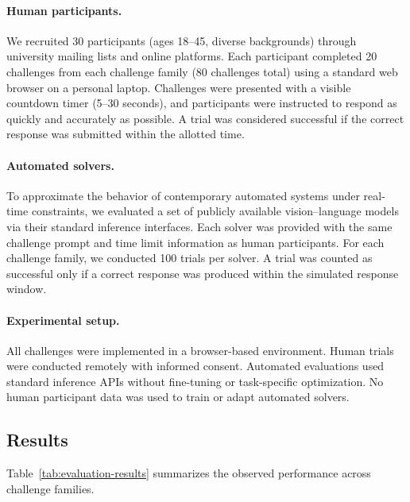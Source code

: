 \documentclass[11pt]{article}
\begin{document}
\paragraph{Human participants.}
We recruited 30 participants (ages 18--45, diverse backgrounds) through university mailing lists and online platforms. Each participant completed 20 challenges from each challenge family (80 challenges total) using a standard web browser on a personal laptop. Challenges were presented with a visible countdown timer (5--30 seconds), and participants were instructed to respond as quickly and accurately as possible. A trial was considered successful if the correct response was submitted within the allotted time.

\paragraph{Automated solvers.}
To approximate the behavior of contemporary automated systems under real-time constraints, we evaluated a set of publicly available vision--language models via their standard inference interfaces. Each solver was provided with the same challenge prompt and time limit information as human participants. For each challenge family, we conducted 100 trials per solver. A trial was counted as successful only if a correct response was produced within the simulated response window.

\paragraph{Experimental setup.}
All challenges were implemented in a browser-based environment. Human trials were conducted remotely with informed consent. Automated evaluations used standard inference APIs without fine-tuning or task-specific optimization. No human participant data was used to train or adapt automated solvers.

\subsection{Results}

Table~\ref{tab:evaluation-results} summarizes the observed performance across challenge families.
\end{document}
